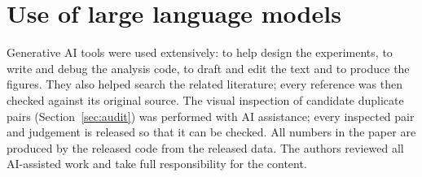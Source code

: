 \section{Use of large language models}
\label{app:llm}

Generative AI tools were used extensively: to help design the experiments, to write and debug the analysis code, to draft and edit the text and to produce the figures. They also helped search the related literature; every reference was then checked against its original source. The visual inspection of candidate duplicate pairs (Section~\ref{sec:audit}) was performed with AI assistance; every inspected pair and judgement is released so that it can be checked. All numbers in the paper are produced by the released code from the released data. The authors reviewed all AI-assisted work and take full responsibility for the content.
